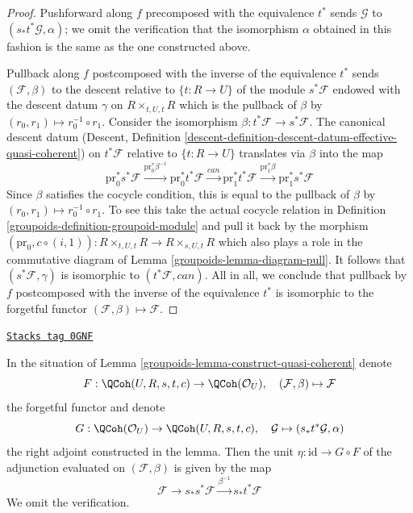 \begin{proof}
\medskip\noindent
Pushforward along $f$ precomposed with the equivalence $t^*$ sends
$\mathcal{G}$ to $(s_*t^*\mathcal{G}, \alpha)$;
we omit the verification that the isomorphism $\alpha$
obtained in this fashion is the same as the one constructed above.

\medskip\noindent
Pullback along $f$ postcomposed with the inverse of the equivalence $t^*$
sends $(\mathcal{F}, \beta)$ to the descent relative to $\{t : R \to U\}$
of the module $s^*\mathcal{F}$ endowed with the descent datum $\gamma$ on
$R \times_{t, U, t} R$ which is the pullback of $\beta$ by
$(r_0, r_1) \mapsto r_0^{-1} \circ r_1$.
Consider the isomorphism $\beta : t^*\mathcal{F} \to s^*\mathcal{F}$.
The canonical descent datum (Descent, Definition
\ref{descent-definition-descent-datum-effective-quasi-coherent})
on $t^*\mathcal{F}$ relative to $\{t : R \to U\}$
translates via $\beta$ into the map
$$
\text{pr}_0^*s^*\mathcal{F}
\xrightarrow{\text{pr}_0^*\beta^{-1}}
\text{pr}_0^*t^*\mathcal{F}
\xrightarrow{can}
\text{pr}_1^*t^*\mathcal{F}
\xrightarrow{\text{pr}_1^*\beta}
\text{pr}_1^*s^*\mathcal{F}
$$
Since $\beta$ satisfies the cocycle condition, this is equal to the pullback
of $\beta$ by $(r_0, r_1) \mapsto r_0^{-1} \circ r_1$. To see this
take the actual cocycle relation in Definition \ref{groupoids-definition-groupoid-module}
and pull it back by the morphism
$(\text{pr}_0, c \circ (i, 1)) : R \times_{t, U, t} R \to R \times_{s, U, t} R$
which also plays a role in the commutative diagram of
Lemma \ref{groupoids-lemma-diagram-pull}. It follows that
$(s^*\mathcal{F}, \gamma)$ is isomorphic to $(t^*\mathcal{F}, can)$.
All in all, we conclude that pullback by $f$ postcomposed with the
inverse of the equivalence $t^*$ is isomorphic to the forgetful functor
$(\mathcal{F}, \beta) \mapsto \mathcal{F}$.
\end{proof}

\begin{remark}
\label{groupoids-remark-adjunction-map}
\href{https://stacks.math.columbia.edu/tag/0GNF}{\texttt{Stacks tag 0GNF}}

In the situation of Lemma \ref{groupoids-lemma-construct-quasi-coherent} denote
$$
F : \QCoh(U, R, s, t, c) \to \QCoh(\mathcal{O}_U),\quad
(\mathcal{F}, \beta) \mapsto \mathcal{F}
$$
the forgetful functor and denote
$$
G : \QCoh(\mathcal{O}_U) \to \QCoh(U, R, s, t, c),\quad
\mathcal{G} \mapsto (s_*t^*\mathcal{G}, \alpha)
$$
the right adjoint constructed in the lemma. Then the unit
$\eta : \text{id} \to G \circ F$ of the adjunction evaluated
on $(\mathcal{F}, \beta)$ is given by the map
$$
\mathcal{F} \to s_*s^*\mathcal{F} \xrightarrow{\beta^{-1}} s_*t^*\mathcal{F}
$$
We omit the verification.
\end{remark}

